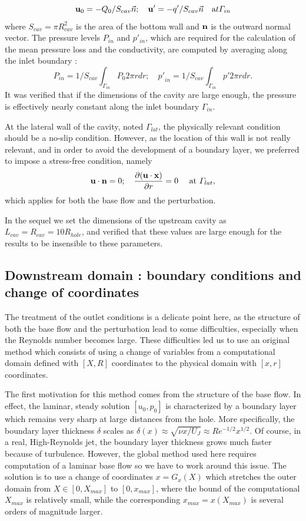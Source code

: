 \documentclass{jfm}
\newcommand\be{\begin{equation}}
\newcommand\ee{\end{equation}}
\newcommand\DP[2]{\frac{\p #1}{\p #2}}
\begin{document}
\be
 {\bf u}_0 = - Q_0/S_{cav} {\vec n} ; \quad {\bf u'} = - q'/S_{cav} {\vec n} \quad {\mbox at } \Gamma_{in}
\ee
where $S_{cav}= \pi R_{cav}^2$ is the area of the bottom wall and ${\bf n}$ is the outward normal vector.
The pressure levels $P_{in}$ and $p'_{in}$, which are required for the calculation of the mean pressure loss and the conductivity, are computed by averaging along the inlet boundary :
\be
 {P}_{in} = 1/S_{cav} \int_{\Gamma_{in}} P_0 2 \pi r dr ; \quad
  {p'}_{in} = 1/S_{cav} \int_{\Gamma_{in}} p' 2 \pi r dr.
\ee
It was verified that if the dimensions of the cavity are large enough, the pressure is effectively nearly constant along the inlet boundary $\Gamma_{in}$.

At the lateral wall of the cavity, noted $\Gamma_{lat}$, the physically relevant condition should be a no-slip condition. However, as the location of this wall is not really relevant, and in order to avoid the development of a boundary layer, 
we preferred to impose a stress-free condition, namely  
\be
 {\bf u} \cdot {\bf n} = 0 ; \quad \DP{({\bf u} \cdot {\bf x})}{r} = 0 \quad \mbox{  at  } \Gamma_{lat},
 \ee
which applies for both the base flow and the perturbation.

In the sequel we set the dimensions of the upstream cavity as $L_{cav} = R_{cav} = 10 R_{hole}$,
and verified that these values are large enough for the results to be insensible to these parameters.

\subsection{Downstream domain : boundary conditions and change of coordinates}

The treatment of the outlet conditions is a delicate point here, as the structure of both the base flow and the perturbation lead to some difficulties, especially when the Reynolds number becomes large. These difficulties led us to use an original method which consists of using a change of variables from a computational domain defined with $[X,R]$ coordinates to the physical domain with $[x,r]$ coordinates.

The first motivation for this method comes from the structure of the base flow. In effect, the laminar, steady solution 
 $[u_0,p_0]$ is characterized by a boundary layer which remains very sharp at large distances from the hole. More specifically, the boundary layer thickness $\delta$ scales as  $\delta(x) \approx \sqrt{\nu x/U_J}\approx Re^{-1/2} x^{1/2}$. Of course, in a real, High-Reynolds jet, the boundary layer thickness grows much faster because of turbulence. However, the global method used here requires computation of a laminar base flow  so we have to work around this issue. The solution is to use a change of coordinates $x = G_x(X)$ which stretches the outer domain from $X\in [0,X_{max}]$ to $[0,x_{max}]$, where the bound of the computational $X_{max}$ is relatively small, while the corresponding $x_{max} = x(X_{max})$ is several orders of magnitude larger.
 
\end{document}
